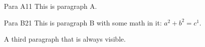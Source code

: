 \documentclass{article}
\begin{document}
\begin{ocg}{Para A}{1}{1}
	This is paragraph A.
\end{ocg}

\begin{ocg}{Para B}{2}{1}
	This is paragraph B with some math in it: $a^2+b^2=c^1$.
\end{ocg}

A third paragraph that is always visible.
\end{document}
